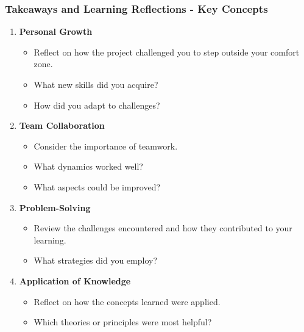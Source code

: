 \documentclass[aspectratio=169]{beamer}
\begin{document}
\begin{frame}[fragile]
  \frametitle{Takeaways and Learning Reflections - Key Concepts}
  \begin{enumerate}
    \item \textbf{Personal Growth}
      \begin{itemize}
        \item Reflect on how the project challenged you to step outside your comfort zone. 
        \item What new skills did you acquire? 
        \item How did you adapt to challenges?
      \end{itemize}

    \item \textbf{Team Collaboration}
      \begin{itemize}
        \item Consider the importance of teamwork. 
        \item What dynamics worked well? 
        \item What aspects could be improved?
      \end{itemize}

    \item \textbf{Problem-Solving}
      \begin{itemize}
        \item Review the challenges encountered and how they contributed to your learning. 
        \item What strategies did you employ?
      \end{itemize}

    \item \textbf{Application of Knowledge}
      \begin{itemize}
        \item Reflect on how the concepts learned were applied. 
        \item Which theories or principles were most helpful?
      \end{itemize}
  \end{enumerate}
\end{frame}
\end{document}
